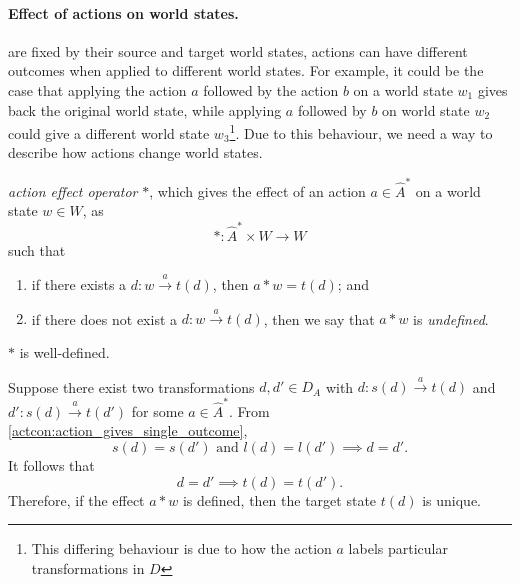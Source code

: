 \paragraph{Effect of actions on world states.}
 are fixed by their source and target world states, actions can have different outcomes when applied to different world states.
For example, it could be the case that applying the action $a$ followed by the action $b$ on a world state $w_{1}$ gives back the original world state, while applying $a$ followed by $b$ on world state $w_{2}$ could give a different world state $w_{3}$\footnote{
This differing behaviour is due to how the action $a$ labels particular transformations in $D$
}.
Due to this behaviour, we need a way to describe how actions change world states.

 \emph{action effect operator} $\ast$, which gives the effect of an action $a \in \hat{A}^{*}$ on a world state $w \in W$, as
\begin{equation}
	\ast: \hat{A}^{*} \times W \to W
\end{equation}
such that
\begin{enumerate}
	\item if there exists a $d: w \xrightarrow{a} t(d)$, then $a \ast w = t(d)$; and
	\item if there does not exist a $d: w \xrightarrow{a} t(d)$, then we say that $a \ast w$ is \emph{undefined}.
\end{enumerate}


\begin{propositionE}
    $\ast$ is well-defined.
\end{propositionE}
\begin{proofE}
    Suppose there exist two transformations $d, d' \in D_{A}$ with $d: s(d) \xrightarrow{a} t(d)$ and $d': s(d) \xrightarrow{a} t(d')$ for some $a \in \hat{A}^{*}$.
    From \cref{actcon:action_gives_single_outcome},
    \begin{equation}
        s(d)=s(d') \text{ and } l(d)=l(d') \implies d = d'.
    \end{equation}
    It follows that
    \begin{equation}
         d = d' \implies t(d) = t(d').
    \end{equation}
    Therefore, if the effect $a \ast w$ is defined, then the target state $t(d)$ is unique.
\end{proofE}


